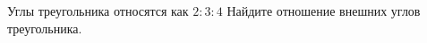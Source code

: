\begin{ex}
	\begin{condition}
		Углы треугольника относятся как \( 2 : 3 : 4 \) Найдите отношение внешних углов треугольника.
	\end{condition}
\end{ex}